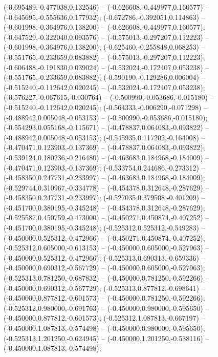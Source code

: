  (-0.695489,-0.477038,0.132546) -- (-0.626608,-0.449977,0.160577) -- (-0.645695,-0.555636,0.177932);
 (-0.672786,-0.392051,0.114863) -- (-0.601998,-0.364976,0.138200) -- (-0.626608,-0.449977,0.160577);
 (-0.647529,-0.322040,0.093576) -- (-0.575013,-0.297207,0.112223) -- (-0.601998,-0.364976,0.138200);
 (-0.625460,-0.255848,0.068253) -- (-0.551765,-0.233659,0.083882) -- (-0.575013,-0.297207,0.112223);
 (-0.606488,-0.191830,0.039024) -- (-0.532024,-0.172407,0.053238) -- (-0.551765,-0.233659,0.083882);
 (-0.590190,-0.129286,0.006004) -- (-0.515240,-0.112642,0.020245) -- (-0.532024,-0.172407,0.053238);
 (-0.576227,-0.067615,-0.030764) -- (-0.500990,-0.053686,-0.015180) -- (-0.515240,-0.112642,0.020245);
 (-0.564333,-0.006290,-0.071298) -- (-0.488942,0.005048,-0.053153) -- (-0.500990,-0.053686,-0.015180);
 (-0.554293,0.055168,-0.115671) -- (-0.478837,0.064083,-0.093822) -- (-0.488942,0.005048,-0.053153);
 (-0.545935,0.117202,-0.164008) -- (-0.470471,0.123903,-0.137369) -- (-0.478837,0.064083,-0.093822);
 (-0.539124,0.180236,-0.216480) -- (-0.463683,0.184968,-0.184009) -- (-0.470471,0.123903,-0.137369);
 (-0.533754,0.244686,-0.273312) -- (-0.458350,0.247731,-0.233997) -- (-0.463683,0.184968,-0.184009);
 (-0.529744,0.310967,-0.334778) -- (-0.454378,0.312648,-0.287629) -- (-0.458350,0.247731,-0.233997);
 (-0.527035,0.379508,-0.401209) -- (-0.451700,0.380195,-0.345248) -- (-0.454378,0.312648,-0.287629);
 (-0.525587,0.450759,-0.473000) -- (-0.450271,0.450874,-0.407252) -- (-0.451700,0.380195,-0.345248);
 (-0.525312,0.525312,-0.549283) -- (-0.450000,0.525312,-0.472966) -- (-0.450271,0.450874,-0.407252);
 (-0.525312,0.605000,-0.613153) -- (-0.450000,0.605000,-0.527963) -- (-0.450000,0.525312,-0.472966);
 (-0.525313,0.690313,-0.659336) -- (-0.450000,0.690312,-0.567729) -- (-0.450000,0.605000,-0.527963);
 (-0.525313,0.781250,-0.687832) -- (-0.450000,0.781250,-0.592266) -- (-0.450000,0.690312,-0.567729);
 (-0.525313,0.877812,-0.698641) -- (-0.450000,0.877812,-0.601573) -- (-0.450000,0.781250,-0.592266);
 (-0.525312,0.980000,-0.691763) -- (-0.450000,0.980000,-0.595650) -- (-0.450000,0.877812,-0.601573);
 (-0.525312,1.087813,-0.667197) -- (-0.450000,1.087813,-0.574498) -- (-0.450000,0.980000,-0.595650);
 (-0.525313,1.201250,-0.624945) -- (-0.450000,1.201250,-0.538116) -- (-0.450000,1.087813,-0.574498);
